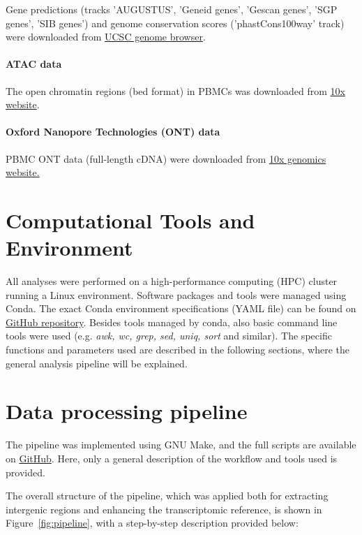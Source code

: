Gene predictions (tracks 'AUGUSTUS', 'Geneid genes', 'Gescan genes', 'SGP genes', 'SIB genes') and 
genome conservation scores ('phastCons100way' track) were downloaded from \href{https://genome.ucsc.edu/}{UCSC genome browser}.

\paragraph{ATAC data}

The open chromatin regions (bed format) in PBMCs was downloaded from \href{https://www.10xgenomics.com/datasets/10k-human-pbmcs-atac-v2-chromium-controller-2-standard}{10x website}.

\paragraph{Oxford Nanopore Technologies (ONT) data}

PBMC ONT data (full-length cDNA) were downloaded from \href{https://www.10xgenomics.com/datasets/5k-human-pbmcs-3-v3-1-chromium-controller-3-1-standard}{10x genomics website.}

\section{Computational Tools and Environment}

All analyses were performed on a high-performance computing (HPC) cluster running a Linux environment.
Software packages and tools were managed using Conda.
The exact Conda environment specifications (YAML file) can be found on \href{https://github.com/JuozapasI/MasterThesis/}{GitHub repository}.
Besides tools managed by conda, also basic command line tools were used (e.g. \textit{awk, wc, grep, sed, uniq, sort} and similar).
The specific functions and parameters used are described in the following sections, where the general analysis pipeline will be explained.

\section{Data processing pipeline}

The pipeline was implemented using GNU Make,
and the full scripts are available on \href{https://github.com/JuozapasI/MasterThesis/}{GitHub}.
Here, only a general description of the workflow and tools used is provided.

The overall structure of the pipeline, which was applied both for extracting intergenic regions and enhancing the transcriptomic reference, is shown in Figure~\ref{fig:pipeline}, with a step-by-step description provided below:

